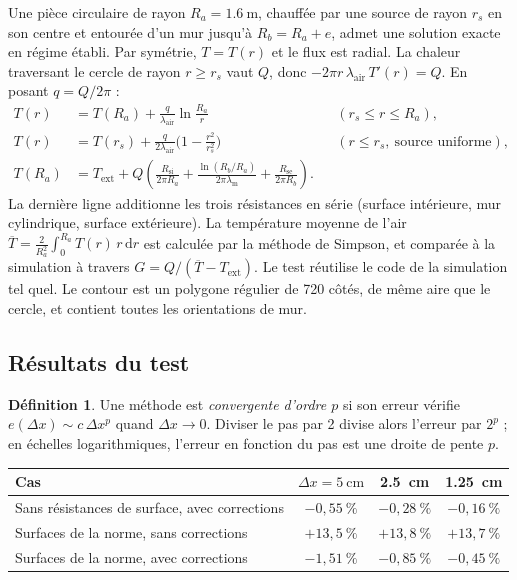\documentclass[11pt,a4paper]{article}
\theoremstyle{definition}
\newtheorem{definition}{Définition}
\theoremstyle{remark}
\newcommand{\dx}{\Delta x}
\newcommand{\Text}{T_{\mathrm{ext}}}
\newcommand{\Rsi}{R_{\mathrm{si}}}
\newcommand{\Rse}{R_{\mathrm{se}}}
\newcommand{\la}{\lambda_{\mathrm{air}}}
\newcommand{\lm}{\lambda_{\mathrm{m}}}
\begin{document}
Une pièce circulaire de rayon $R_a = \qty{1,6}{\metre}$, chauffée par une source de
rayon $r_s$ en son centre et entourée d'un mur jusqu'à $R_b = R_a + e$, admet une
solution exacte en régime établi. Par symétrie, $T = T(r)$ et le flux est radial.
La chaleur traversant le cercle de rayon $r\ge r_s$ vaut $Q$, donc
$-2\pi r\,\la\,T'(r) = Q$. En posant $q = Q/2\pi$ :
\begin{align*}
T(r) &= T(R_a) + \frac{q}{\la}\ln\frac{R_a}{r} && (r_s\le r\le R_a),\\
T(r) &= T(r_s) + \frac{q}{2\la}\Big(1-\frac{r^2}{r_s^2}\Big) && (r\le r_s,\ \text{source uniforme}),\\
T(R_a) &= \Text + Q\left(\frac{\Rsi}{2\pi R_a} + \frac{\ln(R_b/R_a)}{2\pi\lm} + \frac{\Rse}{2\pi R_b}\right).
\end{align*}
La dernière ligne additionne les trois résistances en série (surface intérieure,
mur cylindrique, surface extérieure). La température moyenne de l'air
$\overline{T} = \frac{2}{R_a^2}\int_0^{R_a}T(r)\,r\,\mathrm{d}r$ est calculée par la
méthode de Simpson, et comparée à la simulation à travers
$G = Q/(\overline{T}-\Text)$. Le test réutilise le code de la simulation tel quel. Le
contour est un polygone régulier de 720 côtés, de même aire que le cercle, et
contient toutes les orientations de mur.

\subsection{Résultats du test}

\begin{definition}
Une méthode est \emph{convergente d'ordre $p$} si son erreur vérifie
$e(\dx) \sim c\,\dx^{p}$ quand $\dx\to0$. Diviser le pas par 2 divise alors l'erreur
par $2^p$ ; en échelles logarithmiques, l'erreur en fonction du pas est une droite de
pente $p$.
\end{definition}

\begin{center}
\begin{tabular}{lccc}
\toprule
Cas & $\dx = \qty{5}{\centi\metre}$ & \qty{2,5}{\centi\metre} & \qty{1,25}{\centi\metre}\\
\midrule
Sans résistances de surface, avec corrections & $-0,55~\%$ & $-0,28~\%$ & $-0,16~\%$\\
Surfaces de la norme, sans corrections & $+13,5~\%$ & $+13,8~\%$ & $+13,7~\%$\\
Surfaces de la norme, avec corrections & $-1,51~\%$ & $-0,85~\%$ & $-0,45~\%$\\
\bottomrule
\end{tabular}
\end{center}
\end{document}
